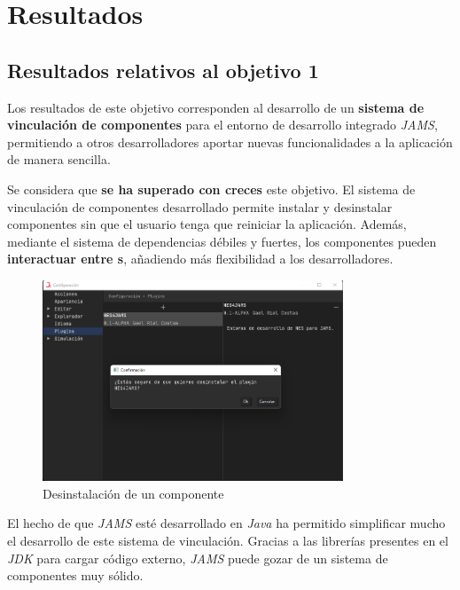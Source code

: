\chapter{Resultados}\label{ch:resultados}


\section{Resultados relativos al objetivo 1}\label{sec:resultados-relativos-al-objetivo-1}

Los resultados de este objetivo corresponden al desarrollo
de un \textbf{sistema de vinculación de componentes} para el
entorno de desarrollo integrado \textit{JAMS},
permitiendo a otros desarrolladores aportar nuevas funcionalidades
a la aplicación de manera sencilla.

Se considera que \textbf{se ha superado con creces}  este objetivo.
El sistema de vinculación de componentes desarrollado permite
instalar y desinstalar componentes sin que el usuario tenga
que reiniciar la aplicación.
Además, mediante el sistema de dependencias débiles y fuertes,
los componentes pueden \textbf{interactuar entre s}, añadiendo
más flexibilidad a los desarrolladores.

\begin{figure}[h]
    \centering
    \includegraphics[width=0.8\textwidth]{images/results/jams-uninstall}
    \caption{Desinstalación de un componente}
    \label{fig:jams-uninstall}
\end{figure}

El hecho de que \textit{JAMS} esté desarrollado en \textit{Java}
ha permitido simplificar mucho el desarrollo de este sistema
de vinculación.
Gracias a las librerías presentes en el \textit{JDK} para cargar
código externo, \textit{JAMS} puede gozar de un sistema de componentes
muy sólido.

